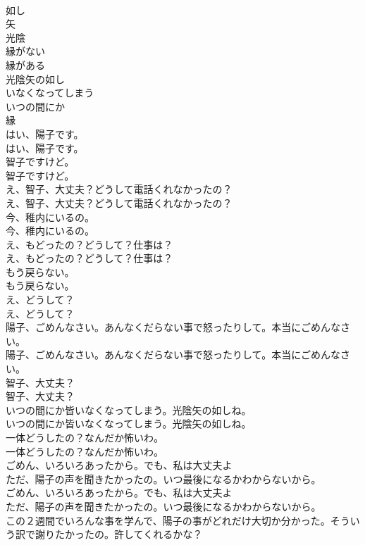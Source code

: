 \documentclass[8pt]{extreport}
\begin{document}
\begin{CJK}{UTF8}{min}
\\	如し
\\	矢
\\	光陰
\\	縁がない
\\	縁がある
\\	光陰矢の如し
\\	いなくなってしまう
\\	いつの間にか
\\	縁
\\	はい、陽子です。	
\\	はい、陽子です。 
\\	智子ですけど。	
\\	智子ですけど。 
\\	え、智子、大丈夫？どうして電話くれなかったの？	
\\	え、智子、大丈夫？どうして電話くれなかったの？ 
\\	今、稚内にいるの。	
\\	今、稚内にいるの。 
\\	え、もどったの？どうして？仕事は？	
\\	え、もどったの？どうして？仕事は？ 
\\	もう戻らない。	
\\	もう戻らない。 
\\	え、どうして？	
\\	え、どうして？ 
\\	陽子、ごめんなさい。あんなくだらない事で怒ったりして。本当にごめんなさい。	
\\	陽子、ごめんなさい。あんなくだらない事で怒ったりして。本当にごめんなさい。 
\\	智子、大丈夫？	
\\	智子、大丈夫？ 
\\	いつの間にか皆いなくなってしまう。光陰矢の如しね。	
\\	いつの間にか皆いなくなってしまう。光陰矢の如しね。 
\\	一体どうしたの？なんだか怖いわ。	
\\	一体どうしたの？なんだか怖いわ。 
\\	ごめん、いろいろあったから。でも、私は大丈夫よ
\\	ただ、陽子の声を聞きたかったの。いつ最後になるかわからないから。	
\\	ごめん、いろいろあったから。でも、私は大丈夫よ
\\	ただ、陽子の声を聞きたかったの。いつ最後になるかわからないから。 
\\	この２週間でいろんな事を学んで、陽子の事がどれだけ大切か分かった。そういう訳で謝りたかったの。許してくれるかな？	

\end{CJK}
\end{document}
